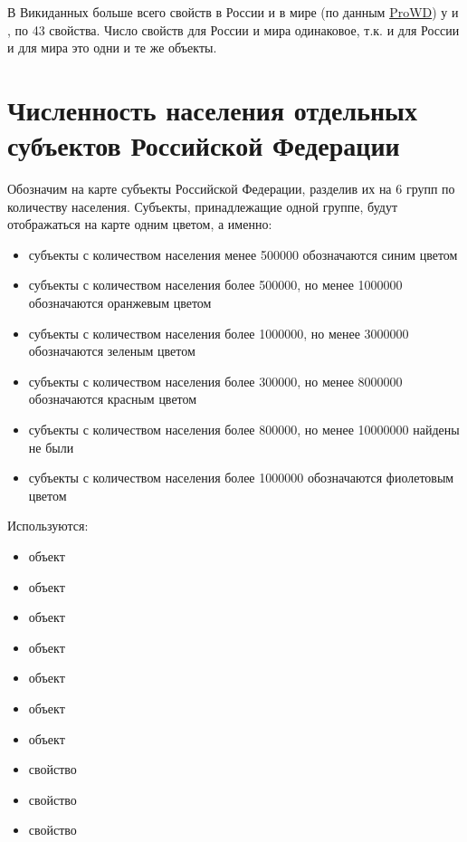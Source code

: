 В Викиданных больше всего свойств в России и в мире (по данным \href{https://prowd.id/dashboards/68f1cfd5b84d/profile}{ProWD}) у  и , по 43 свойства. Число свойств для России и мира одинаковое, т.к. и для России и для мира это одни и те же объекты.

\section{Численность населения отдельных субъектов Российской Федерации}

Обозначим на карте субъекты Российской Федерации, разделив их на 6 групп по количеству населения. Субъекты, принадлежащие одной группе, будут отображаться на карте одним цветом, а именно:
\begin{itemize}
  \item субъекты с количеством населения менее \num{500000} обозначаются синим цветом
  \item субъекты с количеством населения более \num{500000}, но менее \num{1000000} обозначаются оранжевым цветом
  \item субъекты с количеством населения более \num{1000000}, но менее \num{3000000} обозначаются зеленым цветом
  \item субъекты с количеством населения более \num{300000}, но менее \num{8000000} обозначаются красным цветом
  \item субъекты с количеством населения более \num{800000}, но менее \num{10000000} найдены не были
  \item субъекты с количеством населения более \num{1000000} обозначаются фиолетовым цветом
\end{itemize}

Используются:
\begin{itemize}
  \item объект 
  \item объект 
  \item объект 
  \item объект 
  \item объект 
  \item объект 
  \item объект 
  \item свойство 
  \item свойство 
  \item свойство 
\end{itemize}

